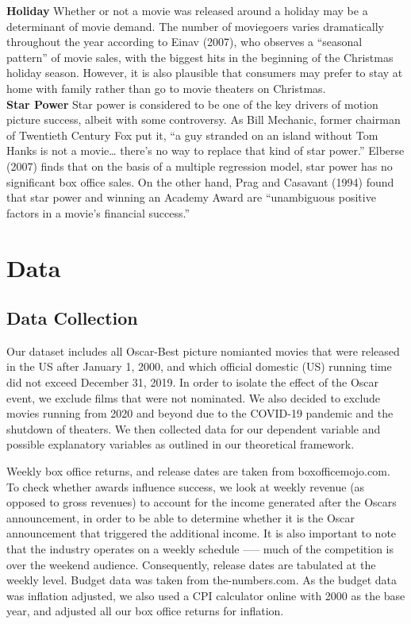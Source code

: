 \documentclass[11pt]{article} %
\begin{document}
\begin{adjustwidth}{1cm}{}
\textbf{Holiday}\newline
Whether or not a movie was released around a holiday may be a determinant of movie demand. The number of moviegoers varies dramatically throughout the year according to Einav (2007), who observes a “seasonal pattern” of movie sales, with the biggest hits in the beginning of the Christmas holiday season. However, it is also plausible that consumers may prefer to stay at home with family rather than go to movie theaters on Christmas. \\

\textbf{Star Power}\newline
Star power is considered to be one of the key drivers of motion picture success, albeit with some controversy. As Bill Mechanic, former chairman of Twentieth Century Fox put it, “a guy stranded on an island without Tom Hanks is not a movie… there's no way to replace that kind of star power.”  Elberse (2007) finds that on the basis of a multiple regression model, star power has no significant box office sales. On the other hand, Prag and Casavant (1994) found that star power and winning an Academy Award are “unambiguous positive factors in a movie’s financial success.” 
\end{adjustwidth}


\setlength{\parindent}{20pt}

\section{Data}
\subsection{Data Collection} 
Our dataset includes all Oscar-Best picture nomianted movies that were released in the US after January 1, 2000, and which official domestic (US) running time did not exceed December 31, 2019. In order to isolate the effect of the Oscar event, we exclude films that were not nominated. We also decided to exclude movies running from 2020 and beyond due to the COVID-19 pandemic and the shutdown of theaters. We then collected data for our dependent variable and possible explanatory variables as outlined in our theoretical framework. 

Weekly box office returns, and release dates are taken from boxofficemojo.com. To check whether awards influence success, we look at weekly revenue (as opposed to gross revenues) to account for the income generated after the Oscars announcement, in order to be able to determine whether it is the Oscar announcement that triggered the additional income. It is also important to note that the industry operates on a weekly schedule --— much of the competition is over the weekend audience. Consequently, release dates are tabulated at the weekly level. Budget data was taken from the-numbers.com. As the budget data was inflation adjusted, we also used a CPI calculator online with 2000 as the base year, and adjusted all our box office returns for inflation.
\end{document}
